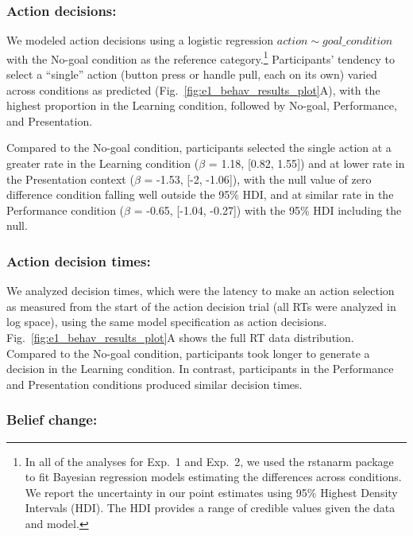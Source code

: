 \documentclass[10pt, letterpaper]{article}
\begin{document}
\subsubsection{Action decisions:}\label{action-decisions}

We modeled action decisions using a logistic regression
\texttt{$action \sim goal\_condition$} with the No-goal condition as the
reference
category.\footnote{In all of the analyses for Exp.\ 1 and Exp.\ 2, we used the {\selectfont rstanarm} package to fit Bayesian regression models estimating the differences across conditions. We report the uncertainty in our point estimates using 95\% Highest Density Intervals (HDI). The HDI provides a range of credible values given the data and model.}
Participants' tendency to select a ``single'' action (button press or
handle pull, each on its own) varied across conditions as predicted
(Fig.~\ref{fig:e1_behav_results_plot}A), with the highest proportion in
the Learning condition, followed by No-goal, Performance, and
Presentation.

Compared to the No-goal condition, participants selected the single
action at a greater rate in the Learning condition (\(\beta\) = 1.18,
{[}0.82, 1.55{]}) and at lower rate in the Presentation context
(\(\beta\) = -1.53, {[}-2, -1.06{]}), with the null value of zero
difference condition falling well outside the 95\% HDI, and at similar
rate in the Performance condition (\(\beta\) = -0.65, {[}-1.04,
-0.27{]}) with the 95\% HDI including the null.

\subsubsection{Action decision times:}\label{action-decision-times}

We analyzed decision times, which were the latency to make an action
selection as measured from the start of the action decision trial (all
RTs were analyzed in log space), using the same model specification as
action decisions. Fig.~\ref{fig:e1_behav_results_plot}A shows the full
RT data distribution. Compared to the No-goal condition, participants
took longer to generate a decision in the Learning condition. In
contrast, participants in the Performance and Presentation conditions
produced similar decision times.

\subsubsection{Belief change:}\label{belief-change}
\end{document}
